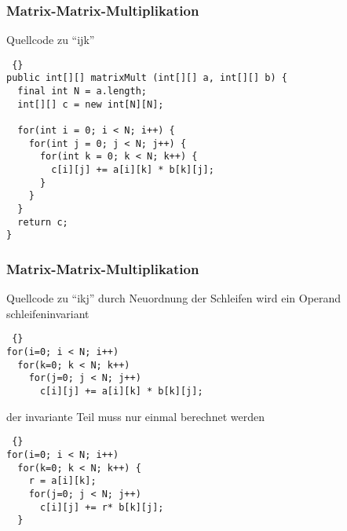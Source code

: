 \begin{frame}[fragile]
\frametitle {Matrix-Matrix-Multiplikation} 
	\begin{block} {Quellcode zu ``ijk''}

	\begin{lstlisting} {}
public int[][] matrixMult (int[][] a, int[][] b) {
  final int N = a.length;
  int[][] c = new int[N][N];
  
  for(int i = 0; i < N; i++) {
    for(int j = 0; j < N; j++) {
      for(int k = 0; k < N; k++) {
        c[i][j] += a[i][k] * b[k][j];
      }
    }
  }
  return c;
}
	\end{lstlisting}
	\end{block} 
\end{frame}

\begin{frame}[fragile]
\frametitle {Matrix-Matrix-Multiplikation} 
	\begin{block} {Quellcode zu ``ikj''}
durch Neuordnung der Schleifen wird ein Operand schleifeninvariant \pause
	\begin{lstlisting} {}
for(i=0; i < N; i++)
  for(k=0; k < N; k++)
    for(j=0; j < N; j++)
      c[i][j] += a[i][k] * b[k][j];
	\end{lstlisting}
der invariante Teil muss nur einmal berechnet werden \pause
	\begin{lstlisting} {}
for(i=0; i < N; i++)
  for(k=0; k < N; k++) {
    r = a[i][k];
    for(j=0; j < N; j++)
      c[i][j] += r* b[k][j];
  }
	\end{lstlisting}
	\end{block} 
\end{frame}


